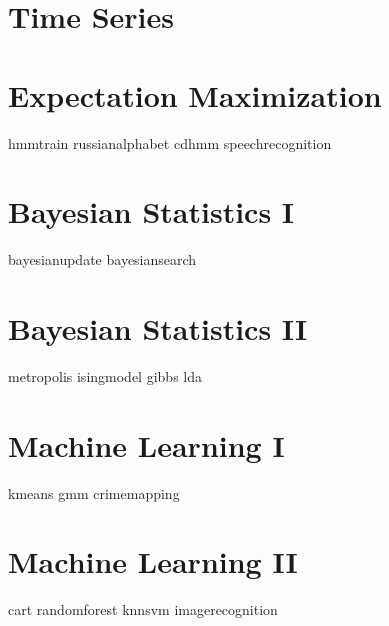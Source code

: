 \documentclass[nociteref]{SIAM-GH-book}
\begin{document}
\part{Time Series}

\part{Expectation Maximization}
{hmmtrain}
{russianalphabet}
{cdhmm}
{speechrecognition}

\part{Bayesian Statistics I}
{bayesianupdate}
{bayesiansearch}

\part{Bayesian Statistics II}
{metropolis}
{isingmodel}
{gibbs}
{lda}

\part{Machine Learning I}
{kmeans}
{gmm}
{crimemapping}

\part{Machine Learning II}
{cart}
{randomforest}
{knnsvm}
{imagerecognition}
\end{document}
